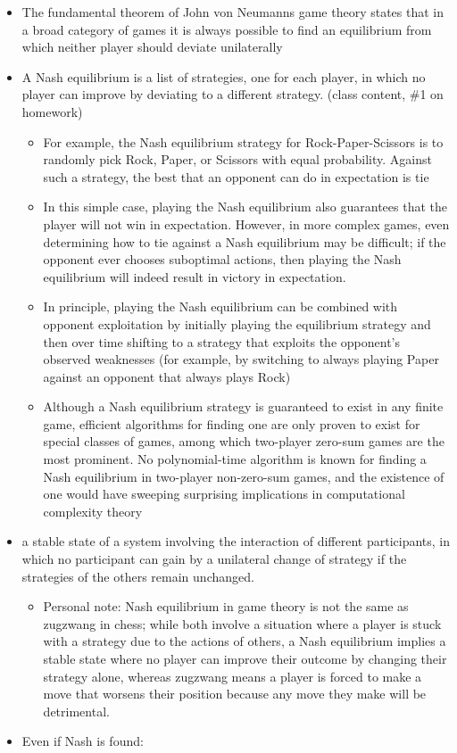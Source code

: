 \documentclass[
]{article}
\begin{document}
\begin{itemize}
\item
  The fundamental theorem of John von Neumann\textquotesingle s game
  theory states that in a broad category of games it is always possible
  to find an equilibrium from which neither player should deviate
  unilaterally
\item
  A Nash equilibrium is a list of strategies, one for each player, in
  which no player can improve by deviating to a different strategy.
  (class content, \#1 on homework)

  \begin{itemize}
  \item
    For example, the Nash equilibrium strategy for Rock-Paper-Scissors
    is to randomly pick Rock, Paper, or Scissors with equal probability.
    Against such a strategy, the best that an opponent can do in
    expectation is tie
  \item
    In this simple case, playing the Nash equilibrium also guarantees
    that the player will not win in expectation. However, in more
    complex games, even determining how to tie against a Nash
    equilibrium may be difficult; if the opponent ever chooses
    suboptimal actions, then playing the Nash equilibrium will indeed
    result in victory in expectation.
  \item
    In principle, playing the Nash equilibrium can be combined with
    opponent exploitation by initially playing the equilibrium strategy
    and then over time shifting to a strategy that exploits the
    opponent's observed weaknesses (for example, by switching to always
    playing Paper against an opponent that always plays Rock)
  \item
    Although a Nash equilibrium strategy is guaranteed to exist in any
    finite game, efficient algorithms for finding one are only proven to
    exist for special classes of games, among which two-player zero-sum
    games are the most prominent. No polynomial-time algorithm is known
    for finding a Nash equilibrium in two-player non-zero-sum games, and
    the existence of one would have sweeping surprising implications in
    computational complexity theory
  \end{itemize}
\item
  a stable state of a system involving the interaction of different
  participants, in which no participant can gain by a unilateral change
  of strategy if the strategies of the others remain unchanged.

  \begin{itemize}
  \item
    Personal note: Nash equilibrium in game theory is not the same as
    zugzwang in chess; while both involve a situation where a player is
    stuck with a strategy due to the actions of others, a Nash
    equilibrium implies a stable state where no player can improve their
    outcome by changing their strategy alone, whereas zugzwang means a
    player is forced to make a move that worsens their position because
    any move they make will be detrimental.
  \end{itemize}
\item
  Even if Nash is found:


\end{itemize}
\end{document}
